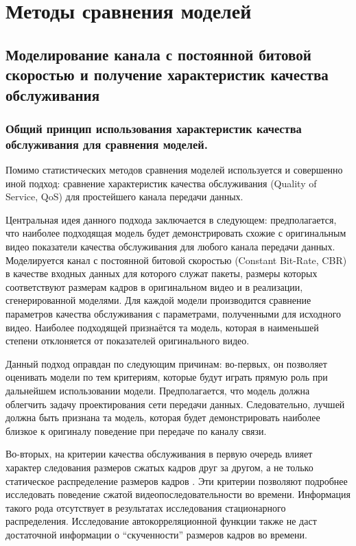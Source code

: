 \section{Методы сравнения моделей}

\subsection{Моделирование канала с постоянной битовой
скоростью и получение характеристик качества
обслуживания}

\subsubsection{Общий принцип использования характеристик
качества обслуживания для сравнения моделей.}

\hspace{3pt}
Помимо статистических методов сравнения моделей используется
\cite{}
и совершенно иной подход: сравнение характеристик качества
обслуживания (Quality of Service, QoS) для простейшего
канала передачи данных.

Центральная идея данного подхода заключается в следующем:
предполагается, что наиболее подходящая модель будет демонстрировать
схожие с оригинальным видео показатели качества обслуживания
для любого канала передачи данных. Моделируется канал с постоянной
битовой скоростью (Constant Bit-Rate, CBR) в качестве входных
данных для которого служат пакеты, размеры которых соответствуют
размерам кадров в оригинальном видео и в реализации,
сгенерированной моделями. Для каждой модели производится сравнение
параметров качества обслуживания с параметрами, полученными
для исходного видео. Наиболее подходящей признаётся та модель,
которая в наименьшей степени отклоняется от показателей оригинального
видео.

Данный подход оправдан по следующим причинам: во-первых,
он позволяет оценивать модели по тем критериям, которые
будут играть прямую роль при дальнейшем использовании модели.
Предполагается, что модель должна облегчить задачу проектирования
сети передачи данных. Следовательно, лучшей должна быть признана
та модель, которая будет демонстрировать наиболее близкое
к оригиналу поведение при передаче по каналу связи.

Во-вторых, на критерии качества обслуживания в первую очередь
влияет характер следования размеров сжатых кадров друг за
другом, а не только статическое распределение размеров
кадров \cite{}.
Эти критерии позволяют подробнее исследовать поведение сжатой
видеопоследовательности во времени. Информация такого
рода отсутствует в результатах исследования стационарного
распределения. Исследование автокорреляционной функции
также не даст достаточной информации о ``скученности'' размеров
кадров во времени.

